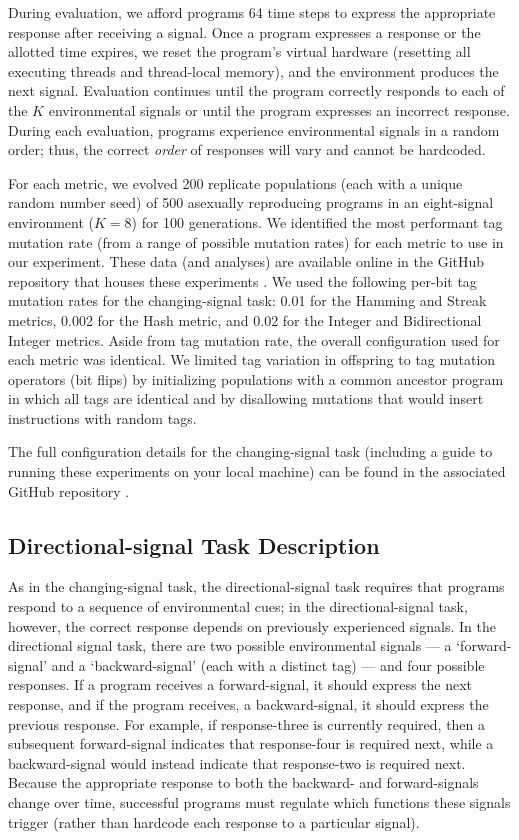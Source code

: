 During evaluation, we afford programs 64 time steps to express the appropriate response after receiving a signal.
Once a program expresses a response or the allotted time expires, we reset the program's virtual hardware (resetting all executing threads and thread-local memory), and the environment produces the next signal.
Evaluation continues until the program correctly responds to each of the $K$ environmental signals or until the program expresses an incorrect response.
During each evaluation, programs experience environmental signals in a random order; thus, the correct \textit{order} of responses will vary and cannot be hardcoded.

For each metric, we evolved 200 replicate populations (each with a unique random number seed) of 500 asexually reproducing programs in an eight-signal environment ($K=8$) for 100 generations.
We identified the most performant tag mutation rate (from a range of possible mutation rates) for each metric to use in our experiment.
These data (and analyses) are available online in the GitHub repository that houses these experiments .
We used the following per-bit tag mutation rates for the changing-signal task: 0.01 for the Hamming and Streak metrics, 0.002 for the Hash metric, and 0.02 for the Integer and Bidirectional Integer metrics.
Aside from tag mutation rate, the overall configuration used for each metric was identical.
We limited tag variation in offspring to tag mutation operators (bit flips) by initializing populations with a common ancestor program in which all tags are identical and by disallowing mutations that would insert instructions with random tags.

The full configuration details for the changing-signal task (including a guide to running these experiments on your local machine) can be found in the associated GitHub repository .

\subsection{Directional-signal Task Description}

As in the changing-signal task, the directional-signal task requires that programs respond to a sequence of environmental cues; in the directional-signal task, however, the correct response depends on previously experienced signals.
In the directional signal task, there are two possible environmental signals --- a `forward-signal' and a `backward-signal' (each with a distinct tag) ---  and four possible responses.
If a program receives a forward-signal, it should express the next response, and if the program receives, a backward-signal, it should express the previous response.
For example, if response-three is currently required, then a subsequent forward-signal indicates that response-four is required next, while a backward-signal would instead indicate that response-two is required next.
Because the appropriate response to both the backward- and forward-signals change over time, successful programs must regulate which functions these signals trigger (rather than hardcode each response to a particular signal).

